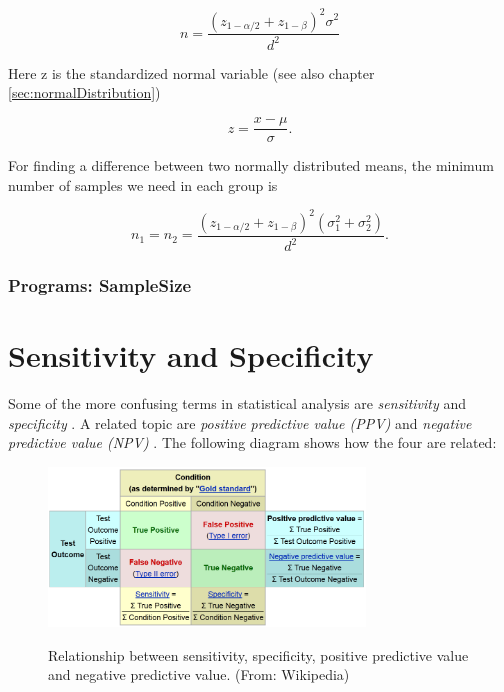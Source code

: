 \begin{equation}
  n = \frac{{{{({z_{1 - \alpha /2}} + {z_{1 - \beta }})}^2}{\sigma ^2}}}{{{d^2}}}
\end{equation}

Here z is the standardized normal variable (see also chapter \ref{sec:normalDistribution})

\begin{equation}
  z = \frac{x-\mu}{\sigma} .
\end{equation}

For finding a difference between two normally distributed means, the minimum number of samples we need in each group is

\begin{equation}
  {n_1} = {n_2} = \frac{{({z_{1 - \alpha /2}} + {z_{1 - \beta }})}^2(\sigma _1^2 + \sigma _2^2)}{d^2} .
\end{equation}

\subsubsection{ Programs: SampleSize }


\section{ Sensitivity and Specificity }

Some of the more confusing terms in statistical analysis are \emph{sensitivity}  and \emph{specificity} . A related topic are \emph{positive predictive value (PPV)}  and \emph{negative predictive value (NPV)} . The following diagram shows how the four are related:

\begin{figure}[ht]
  \centering
  \includegraphics[width=0.75\textwidth]{../Images/Sensitivity_Specificity_Diagram.png}\\
  \caption{Relationship between sensitivity, specificity, positive predictive value and negative predictive value. (From: Wikipedia)}\label{fig:sens_spec_diagram}
\end{figure}

